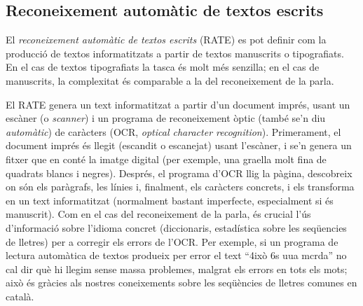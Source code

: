 \subsection{Reconeixement automàtic de textos escrits}
\label{ss:recautcar}

El \emph{reconeixement automàtic de textos escrits} (RATE) es pot definir
  com la producció de textos informatitzats a partir de textos
  manuscrits o tipografiats. En el cas de textos tipografiats la
  tasca és molt més senzilla; en el cas de manuscrits, la complexitat
  és comparable a la del reconeixement de la parla.
  
  El RATE genera un text informatitzat a partir d'un document
  imprés, usant un escàner (o \emph{scanner}) i un programa
  de reconeixement òptic (tam\-bé se'n diu {\em
    automàtic}) de caràcters (OCR, \emph{optical character
    recognition}).  Primerament, el document imprés és llegit
  (escandit o escanejat) usant l'escàner, i se'n genera un fitxer
  que en conté la imatge digital (per exemple, una graella molt fina
  de quadrats blancs i negres).  Després, el programa d'OCR llig
  la pàgina, descobreix on són els paràgrafs, les
  línies i, finalment, els caràcters concrets, i els
  transforma en un text informatitzat (normalment bastant imperfecte,
  especialment si és manuscrit).  Com en el cas del reconeixement de
  la parla, és crucial l'ús d'informació sobre l'idioma concret
  (diccionaris, estadística sobre les seqüencies de lletres) per
  a corregir els errors de l'OCR.  Per exemple, si un programa de
  lectura automàtica de textos produeix per error el text ``4ixò 6s
  uua mcrda'' no cal dir què hi llegim sense massa problemes, malgrat
  els errors en tots els mots; això és gràcies als nostres
  coneixements sobre les seqüències de lletres comunes en català.

